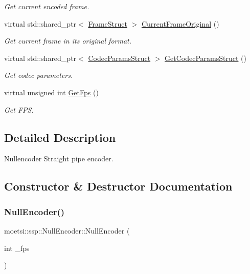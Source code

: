 \begin{DoxyCompactItemize}
\begin{DoxyCompactList}\small\item\em Get current encoded frame. \end{DoxyCompactList}\item 
virtual std\+::shared\+\_\+ptr$<$ \hyperlink{structmoetsi_1_1ssp_1_1FrameStruct}{Frame\+Struct} $>$ \hyperlink{classmoetsi_1_1ssp_1_1NullEncoder_ad972dfdb93d2f609cdc885c53079ede2}{Current\+Frame\+Original} ()
\begin{DoxyCompactList}\small\item\em Get current frame in its original format. \end{DoxyCompactList}\item 
virtual std\+::shared\+\_\+ptr$<$ \hyperlink{structmoetsi_1_1ssp_1_1CodecParamsStruct}{Codec\+Params\+Struct} $>$ \hyperlink{classmoetsi_1_1ssp_1_1NullEncoder_a29839bd02ad42ecd9cf8e6cce707a9fe}{Get\+Codec\+Params\+Struct} ()
\begin{DoxyCompactList}\small\item\em Get codec parameters. \end{DoxyCompactList}\item 
virtual unsigned int \hyperlink{classmoetsi_1_1ssp_1_1NullEncoder_ad6727fa08528622081aa4eca4aacc6c1}{Get\+Fps} ()
\begin{DoxyCompactList}\small\item\em Get F\+PS. \end{DoxyCompactList}\end{DoxyCompactItemize}


\subsection{Detailed Description}
Nullencoder Straight pipe encoder. 

\subsection{Constructor \& Destructor Documentation}
\mbox{\label{classmoetsi_1_1ssp_1_1NullEncoder_aaae4b8ed8b56ae9526f04853b56d1650}} 
\subsubsection{\texorpdfstring{Null\+Encoder()}{NullEncoder()}}
{\footnotesize\ttfamily moetsi\+::ssp\+::\+Null\+Encoder\+::\+Null\+Encoder (\begin{DoxyParamCaption}\item[{int}]{\+\_\+fps }\end{DoxyParamCaption})}



